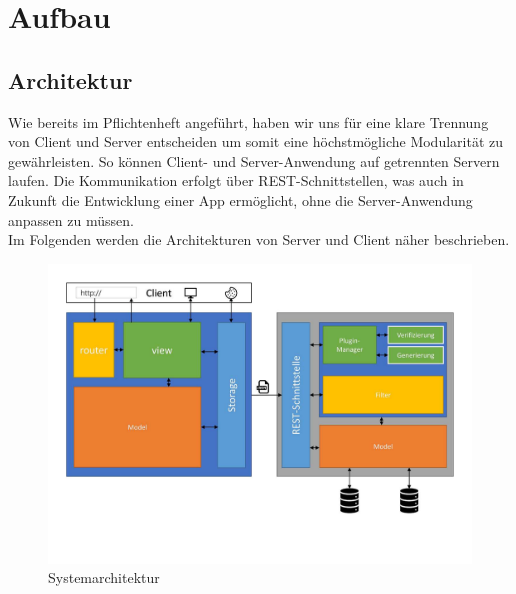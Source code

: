 \section{Aufbau}

\subsection{Architektur}
Wie bereits im Pflichtenheft angeführt, haben wir uns für eine klare Trennung von Client und Server entscheiden um somit eine höchstmögliche Modularität zu gewährleisten. So können Client- und Server-Anwendung auf getrennten Servern laufen. Die Kommunikation erfolgt über REST-Schnittstellen, was auch in Zukunft die Entwicklung einer App ermöglicht, ohne die Server-Anwendung anpassen zu müssen. \\
Im Folgenden werden die Architekturen von Server und Client näher beschrieben.
\begin{figure}[h]
	\centering
	\includegraphics[width=.7\textwidth, clip, trim= {0cm 3cm 0cm 0cm}]{content/diagrams/architecture}
	\caption{Systemarchitektur}
\end{figure}
